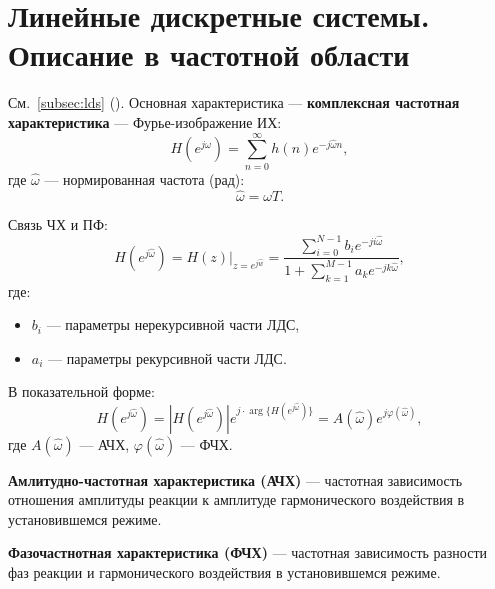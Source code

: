 \documentclass[a4paper, 14pt]{extarticle}
\begin{document}
\section{Линейные дискретные системы. Описание в частотной области}
См.~\ref{subsec:lds} ().
Основная характеристика --- \textbf{комплексная частотная характеристика} --- Фурье-изображение ИХ:
\begin{equation}\label{eq:complex_freq}
    H(e^{j \hat{ \omega }}) = \sum^{\infty}_{n=0} h(n) e^{-j \hat{ \omega } n},
\end{equation}
где $\hat{ \omega }$ --- нормированная частота (рад):
\begin{equation}
    \hat{ \omega } = \omega T.
\end{equation}

Связь ЧХ и ПФ:
\begin{equation}
    H(e^{j \hat{ \omega }}) = H(z) \big\vert_{z=e^{j \hat{w}}} = \dfrac{ \sum\limits^{N-1}_{i=0} b_i e^{-ji \hat{ \omega }} }{1 + \sum\limits^{M-1}_{k=1} a_k e^{-jk \hat{ \omega }}},
\end{equation}
где:
\begin{itemize}
    \item $b_i$ --- параметры нерекурсивной части ЛДС,
    \item $a_i$ --- параметры рекурсивной части ЛДС.
\end{itemize}

В показательной форме:
\begin{equation}
    H(e^{j \hat{ \omega }}) = \left| H(e^{j \hat{ \omega }}) \right| e^{j \cdot \arg \{ H(e^{j \hat{ \omega }}) \} } = A(\hat{ \omega }) e^{j \varphi(\hat{ \omega })},
\end{equation}
где $A(\hat{ \omega })$ --- АЧХ, $\varphi( \hat{ \omega } )$ --- ФЧХ.

\textbf{Амлитудно-частотная характеристика (АЧХ)} --- частотная зависимость отношения амплитуды реакции к амплитуде гармонического воздействия в установившемся режиме.

\textbf{Фазочастнотная характеристика (ФЧХ)} --- частотная зависимость разности фаз реакции и гармонического воздействия в установившемся режиме.
\end{document}
